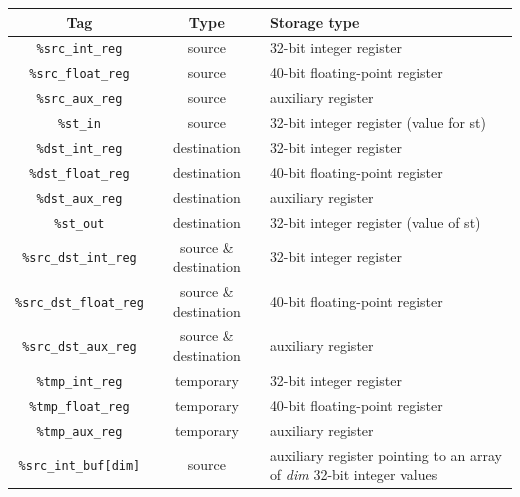 \begin{table}[p]
\begin{center}
\begin{tabular}{|c|c|l|}
\hline
\textbf{Tag} & \textbf{Type} & \textbf{Storage type}\\
\hline
\texttt{\scriptsize \%src\_int\_reg} & {\scriptsize source} & {\scriptsize 32-bit integer register}\\
\hline
\texttt{\scriptsize \%src\_float\_reg} & {\scriptsize source} & {\scriptsize 40-bit floating-point register}\\
\hline
\texttt{\scriptsize \%src\_aux\_reg} & {\scriptsize source} & {\scriptsize auxiliary register}\\
\hline
\texttt{\scriptsize \%st\_in} & {\scriptsize source} & {\scriptsize 32-bit integer register (value for st)}\\
\hline
\texttt{\scriptsize \%dst\_int\_reg} & {\scriptsize destination} & {\scriptsize 32-bit integer register}\\
\hline
\texttt{\scriptsize \%dst\_float\_reg} & {\scriptsize destination} & {\scriptsize 40-bit floating-point register}\\
\hline
\texttt{\scriptsize \%dst\_aux\_reg} & {\scriptsize destination} & {\scriptsize auxiliary register}\\
\hline
\texttt{\scriptsize \%st\_out} & {\scriptsize destination} & {\scriptsize 32-bit integer register (value of st)}\\
\hline
\texttt{\scriptsize \%src\_dst\_int\_reg} & {\scriptsize source \& destination} & {\scriptsize 32-bit integer register}\\
\hline
\texttt{\scriptsize \%src\_dst\_float\_reg} & {\scriptsize source \& destination} & {\scriptsize 40-bit floating-point register}\\
\hline
\texttt{\scriptsize \%src\_dst\_aux\_reg} & {\scriptsize source \& destination} & {\scriptsize auxiliary register}\\
\hline
\texttt{\scriptsize \%tmp\_int\_reg} & {\scriptsize temporary} & {\scriptsize 32-bit integer register}\\
\hline
\texttt{\scriptsize \%tmp\_float\_reg} & {\scriptsize temporary} & {\scriptsize 40-bit floating-point register}\\
\hline
\texttt{\scriptsize \%tmp\_aux\_reg} & {\scriptsize temporary} & {\scriptsize auxiliary register}\\
\hline
\texttt{\scriptsize \%src\_int\_buf[dim]} & {\scriptsize source} & {\scriptsize auxiliary register pointing to an array of \textit{dim} 32-bit integer values}\\

\end{tabular}
\end{center}
\end{table}
